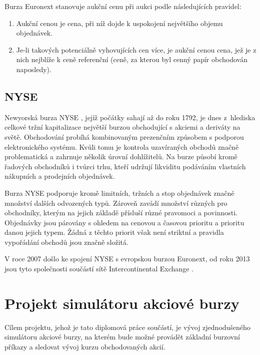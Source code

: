 \documentclass[thesis=M,czech]{FITthesis}[2012/06/26]
\begin{document}
Burza Euronext stanovuje aukční cenu při aukci podle následujících pravidel: 

\begin{enumerate}
	\item Aukční cenou je cena, při níž dojde k uspokojení největšího objemu objednávek.
	\item Je-li takových potenciálně vyhovujících cen více, je aukční cenou cena, jež je z nich nejblíže k ceně 
		referenční (ceně, za kterou byl cenný papír obchodován naposledy).
\end{enumerate}


\subsection{NYSE}

Newyorská burza NYSE \cite{nyse}, jejíž počátky sahají až do roku 1792, je dnes z~hlediska celkové tržní kapitalizace 
největší burzou obchodující s akciemi a deriváty na světě. Obchodování probíhá kombinovaným prezenčním způsobem 
s podporou elektronického systému. Kvůli tomu je kontrola uzavíraných obchodů značně problematická a zahrnuje několik 
úrovní dohlížitelů. Na burze působí kromě řadových obchodníků i tvůrci trhu, kteří udržují likviditu podáváním vlastních 
nákupních a prodejních objednávek. 

Burza NYSE podporuje kromě limitních, tržních a stop objednávek značné množství dalších odvozených typů. Zároveň 
zavádí množství různých  pro obchodníky, kterým na jejich základě přísluší různé pravomoci a povinnosti. 
Objednávky jsou párovány s ohledem na cenovou a časovou prioritu a prioritu danou jejich typem. Žádná z těchto priorit
však není striktní a pravidla vypořádání obchodů jsou značně složitá.

V roce 2007 došlo ke spojení NYSE s evropskou burzou Euronext, od roku 2013 jsou tyto společnosti součástí sítě 
Intercontinental Exchange \cite{ice}. 




\section{Projekt simulátoru akciové burzy} 

Cílem projektu, jehož je tato diplomová práce součástí, je vývoj zjednodušeného simulátoru akciové burzy, na kterém bude 
možné provádět základní burzovní příkazy a sledovat vývoj kurzu obchodovaných akcií.
\end{document}
